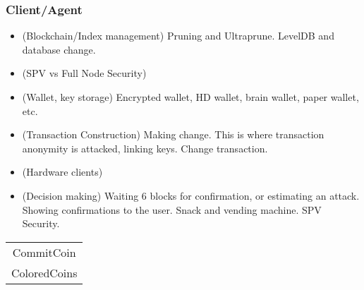 \subsubsection{Client/Agent}
\begin{itemize}
\item (Blockchain/Index management) Pruning and Ultraprune. LevelDB and database change.
\item (SPV vs Full Node Security)
\item (Wallet, key storage) Encrypted wallet, HD wallet, brain wallet, paper wallet, etc.
\item (Transaction Construction) Making change. This is where transaction anonymity is attacked, linking keys. Change transaction.
\item (Hardware clients)
\item (Decision making) Waiting 6 blocks for confirmation, or estimating an attack. Showing confirmations to the user. Snack and vending machine. SPV Security.
\end{itemize}

\begin{table}
\begin{tabular}{c}
CommitCoin \\
ColoredCoins \\
\end{tabular}
\end{table}
